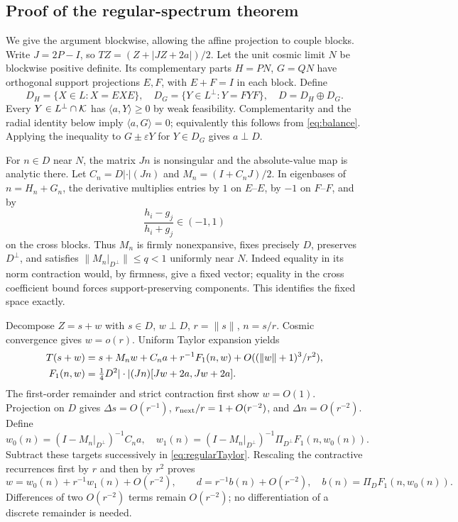 \documentclass[11pt]{article}
\theoremstyle{remark}\newtheorem{remark}[theorem]{Remark}
\newcommand{\ip}[2]{\langle #1,#2\rangle}\newcommand{\norm}[1]{\lVert #1\rVert}
\newcommand{\eps}{\varepsilon}\newcommand{\dd}{\Delta}
\numberwithin{equation}{section}
\begin{document}
\subsection{Proof of the regular-spectrum theorem}
We give the argument blockwise, allowing the affine projection to couple blocks. Write $J=2P-I$, so $TZ=(Z+|JZ+2a|)/2$. Let the unit cosmic limit $N$ be blockwise positive definite. Its complementary parts $H=PN$, $G=QN$ have orthogonal support projections $E,F$, with $E+F=I$ in each block. Define
\[
 D_H=\{X\in L:X=EXE\},\quad
 D_G=\{Y\in L^\perp:Y=FYF\},\quad D=D_H\oplus D_G.
\]
Every $Y\in L^\perp\cap\mathcal K$ has $\ip aY\geq0$ by weak feasibility. Complementarity and the radial identity below imply $\ip aG=0$; equivalently this follows from \eqref{eq:balance}. Applying the inequality to $G\pm\eps Y$ for $Y\in D_G$ gives $a\perp D$.

For $n\in D$ near $N$, the matrix $Jn$ is nonsingular and the absolute-value map is analytic there. Let $C_n=D|\cdot|(Jn)$ and $M_n=(I+C_nJ)/2$. In eigenbases of $n=H_n+G_n$, the derivative multiplies entries by $1$ on $E$--$E$, by $-1$ on $F$--$F$, and by
\[
 \frac{h_i-g_j}{h_i+g_j}\in(-1,1)
\]
on the cross blocks. Thus $M_n$ is firmly nonexpansive, fixes precisely $D$, preserves $D^\perp$, and satisfies $\norm{M_n|_{D^\perp}}\leq q<1$ uniformly near $N$. Indeed equality in its norm contraction would, by firmness, give a fixed vector; equality in the cross coefficient bound forces support-preserving components. This identifies the fixed space exactly.

Decompose $Z=s+w$ with $s\in D$, $w\perp D$, $r=\norm s$, $n=s/r$. Cosmic convergence gives $w=o(r)$. Uniform Taylor expansion yields
\begin{align}\label{eq:regularTaylor}
 T(s+w)&=s+M_nw+C_na+r^{-1}F_1(n,w)
 +O((\norm w+1)^3/r^2),\\
 F_1(n,w)&=\tfrac14D^2|\cdot|(Jn)[Jw+2a,Jw+2a].\notag
\end{align}
The first-order remainder and strict contraction first show $w=O(1)$. Projection on $D$ gives $\dd s=O(r^{-1})$, $r_{\rm next}/r=1+O(r^{-2})$, and $\dd n=O(r^{-2})$. Define
\[
 w_0(n)=(I-M_n|_{D^\perp})^{-1}C_na,
 \quad w_1(n)=(I-M_n|_{D^\perp})^{-1}\Pi_{D^\perp}F_1(n,w_0(n)).
\]
Subtract these targets successively in \eqref{eq:regularTaylor}. Rescaling the contractive recurrences first by $r$ and then by $r^2$ proves
\[
 w=w_0(n)+r^{-1}w_1(n)+O(r^{-2}),\qquad
 d=r^{-1}b(n)+O(r^{-2}),\quad b(n)=\Pi_DF_1(n,w_0(n)).
\]
Differences of two $O(r^{-2})$ terms remain $O(r^{-2})$; no differentiation of a discrete remainder is needed.
\end{document}
